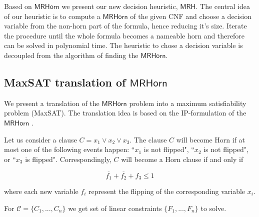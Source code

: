 \documentclass[runningheads]{llncs}
\newcommand{\cls}{\mathcal{C}}
\newcommand{\rhorn}{\mathsf{MRHorn}}
\newcommand{\mrh}{\mathsf{MRH}}
\begin{document}
%
Based on $\rhorn$ we present our new decision heuristic, $\mrh$. The central idea of our heuristic is to compute a $\rhorn$ of the given CNF and choose a decision variable from the non-horn part of the formula, hence reducing it's size. Iterate the procedure until the whole formula becomes a nameable horn and therefore can be solved in polynomial time.
The heuristic to chose a decision variable is decoupled from the algorithm of finding the $\rhorn$. 
%

\subsection{MaxSAT translation of $\rhorn$} \label{subsec:maxsat-translation}

We present a translation of the $\rhorn$ problem into a maximum satisfiability problem (MaxSAT). %
The translation idea is based on the IP-formulation of the $\rhorn$ \cite{Boros99}. 

\begin{example}\label{ex:ip-encoding}
	Let us consider a clause $C = x_1 \lor x_2 \lor x_3$. The clause $C$ will become Horn if
	at most one of the following events happen: ``$x_1$ is not flipped", ``$x_2$ is not flipped",
	or ``$x_3$ is flipped". Correspondingly, $C$ will become a Horn clause if and only if
	
	\[\overline{f_1} + \overline{f_2} + f_3 \leq 1\]
    
    where each new variable $f_i$ represent the flipping of the corresponding variable $x_i$.
\end{example}

For $\cls = \{C_1, ..., C_n\}$ we get set of linear constraints $\{F_1, ..., F_n\}$ to solve. \\
\end{document}
